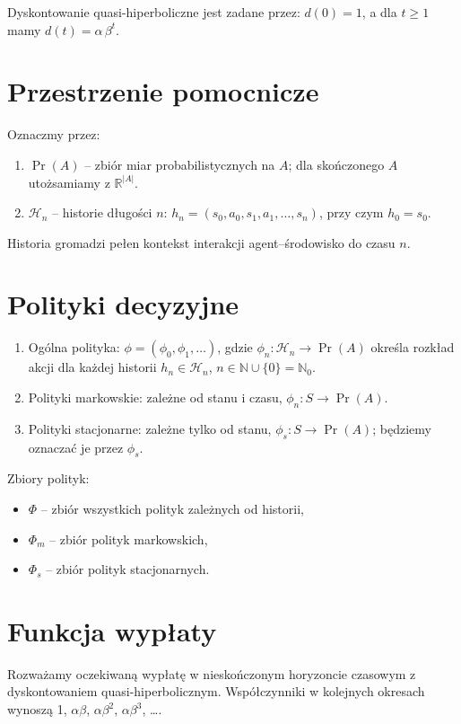 Dyskontowanie quasi-hiperboliczne jest zadane przez: $d(0) = 1$, a dla $t \ge 1$ mamy $d(t) = \alpha\,\beta^t$.

\section{Przestrzenie pomocnicze}

Oznaczmy przez:
\begin{enumerate}
\item $\Pr(A)$ -- zbiór miar probabilistycznych na $A$; dla skończonego $A$ utożsamiamy z $\mathbb{R}^{|A|}$.
\item $\mathcal{H}_n$ -- historie długości $n$: $h_n = (s_0, a_0, s_1, a_1, \ldots, s_n)$, przy czym $h_0 = s_0$.
\end{enumerate}

Historia gromadzi pełen kontekst interakcji agent--środowisko do czasu $n$.

\section{Polityki decyzyjne}

\begin{enumerate}
\item Ogólna polityka: $\phi = (\phi_0, \phi_1, \ldots)$, gdzie $\phi_n : \mathcal{H}_n \rightarrow \Pr(A)$ określa rozkład akcji dla każdej historii $h_n \in \mathcal{H}_n$, $n \in \mathbb{N} \cup \{0\} = \mathbb{N}_0$.
\item Polityki markowskie: zależne od stanu i czasu, $\phi_n : S \rightarrow \Pr(A)$.
\item Polityki stacjonarne: zależne tylko od stanu, $\phi_s : S \rightarrow \Pr(A)$; będziemy oznaczać je przez $\phi_s$.
\end{enumerate}

Zbiory polityk:
\begin{itemize}
\item $\Phi$ -- zbiór wszystkich polityk zależnych od historii,
\item $\Phi_m$ -- zbiór polityk markowskich,
\item $\Phi_s$ -- zbiór polityk stacjonarnych.
\end{itemize}

\section{Funkcja wypłaty}

Rozważamy oczekiwaną wypłatę w nieskończonym horyzoncie czasowym z dyskontowaniem quasi-hiperbolicznym. Współczynniki w kolejnych okresach wynoszą 1, $\alpha \beta$, $\alpha \beta^2$, $\alpha \beta^3$, \ldots.

